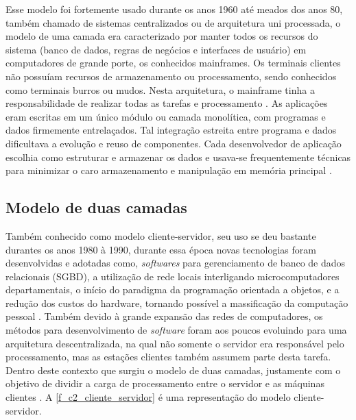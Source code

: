 Esse modelo foi fortemente usado durante os anos 1960 até meados dos anos 80, também chamado de sistemas centralizados ou de arquitetura uni processada, o modelo de uma camada era caracterizado por manter todos os recursos do sistema (banco de dados, regras de negócios e interfaces de usuário) em computadores de grande porte, os conhecidos mainframes. Os terminais clientes não possuíam recursos de armazenamento ou processamento, sendo conhecidos como terminais burros ou mudos. Nesta arquitetura, o mainframe tinha a responsabilidade de realizar todas as tarefas e processamento \cite{devmediaMultiCamada2018}. As aplicações eram escritas em um único módulo ou camada monolítica, com programas e dados firmemente entrelaçados. Tal integração estreita entre programa e dados dificultava a evolução e reuso de componentes. Cada desenvolvedor de aplicação escolhia como estruturar e armazenar os dados e usava-se frequentemente técnicas para minimizar o caro armazenamento e manipulação em memória principal \cite{devmediaMultiCamadaP12018}.


\subsection*{Modelo de duas camadas}

Também conhecido como modelo cliente-servidor, seu uso se deu bastante durantes os anos 1980 à 1990, durante essa época novas tecnologias foram desenvolvidas e adotadas como, \textit{softwares} para gerenciamento de banco de dados relacionais (SGBD), a utilização de rede locais interligando microcomputadores departamentais, o início do paradigma da programação orientada a objetos, e a redução dos custos do hardware, tornando possível a massificação da computação pessoal \cite{devmediaMultiCamadaP12018}. Também devido à grande expansão das redes de computadores, os métodos para desenvolvimento de \textit{software} foram aos poucos evoluindo para uma arquitetura descentralizada, na qual não somente o servidor era responsável pelo processamento, mas as estações clientes também assumem parte desta tarefa. Dentro deste contexto que surgiu o modelo de duas camadas, justamente com o objetivo de dividir a carga de processamento entre o servidor e as máquinas clientes \cite{devmediaMultiCamada2018}. A \autoref{f_c2_cliente_servidor}  é uma representação do modelo cliente-servidor.

